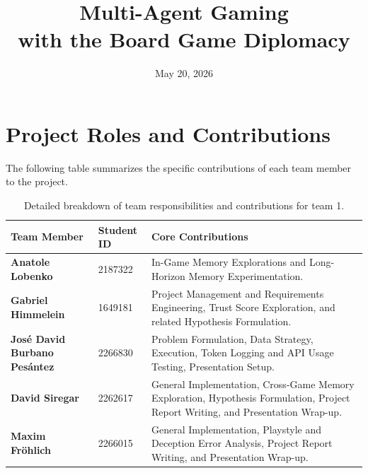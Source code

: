 \documentclass[a4paper,oneside,bibliography=totoc]{scrartcl}
\title{Multi-Agent Gaming \\with the Board Game Diplomacy}
\date{May 20, 2026}
\begin{document}
\maketitle

\section*{Project Roles and Contributions}

The following table summarizes the specific contributions of each team member to the project. 


\begin{table}[htbp]
    \centering
    \renewcommand{\arraystretch}{1.5}
    \begin{tabularx}{\textwidth}{@{} >{\bfseries}l l X @{}}
        \toprule
        Team Member & \textbf{Student ID} & \textbf{Core Contributions} \\
        \midrule
        Anatole Lobenko & 2187322 & In-Game Memory Explorations and Long-Horizon Memory Experimentation. \\
        Gabriel Himmelein & 1649181 & Project Management and Requirements Engineering, Trust Score Exploration, and related Hypothesis Formulation. \\
        José David Burbano Pesántez & 2266830 & Problem Formulation, Data Strategy, Execution, Token Logging and API Usage Testing, Presentation Setup. \\
        David Siregar & 2262617 & General Implementation, Cross-Game Memory Exploration, Hypothesis Formulation, Project Report Writing, and Presentation Wrap-up. \\
        Maxim Fröhlich & 2266015 & General Implementation, Playstyle and Deception Error Analysis, Project Report Writing, and Presentation Wrap-up. \\
        \bottomrule
    \end{tabularx}
    \caption{Detailed breakdown of team responsibilities and contributions for team 1.}
    \label{tab:team_contributions}
\end{table}
\end{document}
